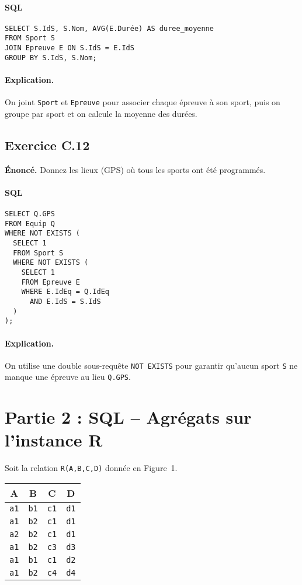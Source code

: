 \documentclass[11pt]{article}
\begin{document}
\paragraph{SQL}
\begin{verbatim}
SELECT S.IdS, S.Nom, AVG(E.Durée) AS duree_moyenne
FROM Sport S
JOIN Epreuve E ON S.IdS = E.IdS
GROUP BY S.IdS, S.Nom;
\end{verbatim}

\paragraph{Explication.}
On joint \texttt{Sport} et \texttt{Epreuve} pour associer chaque épreuve à son sport, puis on groupe par sport et on calcule la moyenne des durées.

\subsection*{Exercice C.12}
\textbf{Énoncé.} Donnez les lieux (GPS) où tous les sports ont été programmés.\\

\paragraph{SQL}
\begin{verbatim}
SELECT Q.GPS
FROM Equip Q
WHERE NOT EXISTS (
  SELECT 1
  FROM Sport S
  WHERE NOT EXISTS (
    SELECT 1
    FROM Epreuve E
    WHERE E.IdEq = Q.IdEq
      AND E.IdS = S.IdS
  )
);
\end{verbatim}

\paragraph{Explication.}
On utilise une double sous-requête \texttt{NOT EXISTS} pour garantir qu'aucun sport \texttt{S} ne manque une épreuve au lieu \texttt{Q.GPS}.

\section*{Partie 2 : SQL -- Agrégats sur l'instance R}
Soit la relation \texttt{R(A,B,C,D)} donnée en Figure~1.

\begin{center}
\begin{tabular}{|c|c|c|c|}
\hline
A & B & C & D \\ \hline
\texttt{a1} & \texttt{b1} & \texttt{c1} & \texttt{d1}\\
\texttt{a1} & \texttt{b2} & \texttt{c1} & \texttt{d1}\\
\texttt{a2} & \texttt{b2} & \texttt{c1} & \texttt{d1}\\
\texttt{a1} & \texttt{b2} & \texttt{c3} & \texttt{d3}\\
\texttt{a1} & \texttt{b1} & \texttt{c1} & \texttt{d2}\\
\texttt{a1} & \texttt{b2} & \texttt{c4} & \texttt{d4}\\\hline
\end{tabular}
\end{center}
\end{document}
